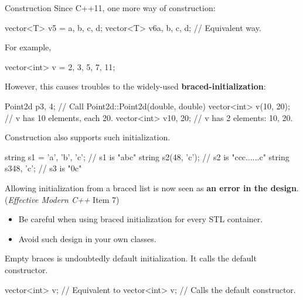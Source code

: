 \begin{frame}[fragile]{Construction}
    Since C++11, one more way of construction:
    \begin{cpp}
vector<T> v5 = {a, b, c, d};
vector<T> v6{a, b, c, d};   // Equivalent way.
    \end{cpp}
    For example,
    \begin{cpp}
vector<int> v = {2, 3, 5, 7, 11};
    \end{cpp}
    \pause
    However, this causes troubles to the widely-used \textbf{braced-initialization}:
    \begin{cpp}
Point2d p{3, 4}; // Call Point2d::Point2d(double, double)
vector<int> v(10, 20); // v has 10 elements, each 20.
vector<int> v{10, 20}; // v has 2 elements: 10, 20.
    \end{cpp}
\end{frame}

\begin{frame}[fragile]{Construction}
     also supports such initialization.
    \begin{cpp}
string s1 = {'a', 'b', 'c'}; // s1 is "abc"
string s2(48, 'c'); // s2 is "ccc......c"
string s3{48, 'c'}; // s3 is "0c"
    \end{cpp}
    Allowing initialization from a braced list is now seen as \textbf{an error in the design}. (\textit{Effective Modern C++} Item 7)
    \begin{itemize}
        \item Be careful when using braced initialization for every STL container.
        \item Avoid such design in your own classes.
    \end{itemize}
    \pause
    Empty braces is undoubtedly default initialization. It calls the default constructor.
    \begin{cpp}
vector<int> v{}; // Equivalent to vector<int> v;
                 // Calls the default constructor.
    \end{cpp}
\end{frame}

